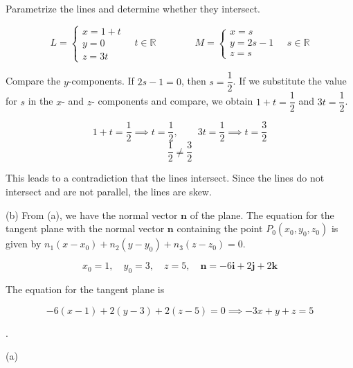\documentclass{article}
\begin{document}
\hfill

\noindent Parametrize the lines and determine whether they intersect.

\[L=\left\{\begin{array}{l}
x=1+t\\
y=0\\
z=3t
\end{array}\right.\quad t\in\mathbb{R}\qquad\qquad M=\left\{\begin{array}{l}
x=s\\
y=2s-1\\
z=s
\end{array}\right.\quad s\in\mathbb{R}\]

\hfill

\noindent Compare the $y$-components. If $2s-1=0$, then $s=\dfrac12$. If we substitute the value for $s$ in the $x$- and $z$- components and compare, we obtain $1+t=\dfrac12$ and $3t=\dfrac12$.

\[1+t=\frac12\implies t=\frac12,\qquad 3t=\frac12\implies t=\frac32\]
\[\frac12\neq\frac32\]

\hfill

\noindent This leads to a contradiction that the lines intersect. Since the lines do not intersect and are not parallel, the lines are skew.

\hfill

\noindent (b) From (a), we have the normal vector $\mathbf n$ of the plane. The equation for the tangent plane with the normal vector $\mathbf n$ containing the point $P_0(x_0,y_0,z_0)$ is given by $n_1(x-x_0)+n_2(y-y_0)+n_3(z-z_0)=0$.

\[x_0=1,\quad y_0=3,\quad z=5,\quad \mathbf n=-6\mathbf{i}+2\mathbf{j}+2\mathbf{k}\]

\hfill

\noindent The equation for the tangent plane is

\[-6(x-1)+2(y-3)+2(z-5)=0\implies\boxed{-3x+y+z=5}\]

\newpage

.

\hfill

\noindent (a)
\begin{center}
\end{center}
\end{document}
